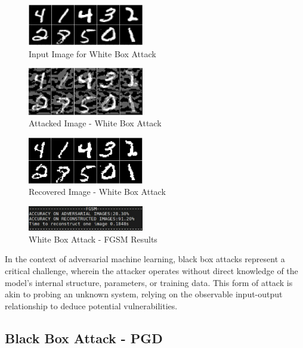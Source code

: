 \documentclass[letterpaper,twocolumn,10pt]{article}
\begin{document}
\begin{figure}[htbp]
  \centering
  \includegraphics[width=0.45\textwidth]{d.png}
  \caption{Input Image for White Box Attack}
  \label{fig:d}
\end{figure}

\begin{figure}[htbp]
  \centering
  \includegraphics[width=0.45\textwidth]{e.png}
  \caption{Attacked Image - White Box Attack}
  \label{fig:e}
\end{figure}

\begin{figure}[htbp]
  \centering
  \includegraphics[width=0.45\textwidth]{f.png}
  \caption{Recovered Image - White Box Attack}
  \label{fig:f}
\end{figure}

\begin{figure}[htbp]
  \centering
  \includegraphics[width=0.45\textwidth]{wfgsm.png}
  \caption{White Box Attack - FGSM Results}
  \label{fig:wfgsm}
\end{figure}

In the context of adversarial machine learning, black box attacks represent a critical challenge, wherein the attacker operates without direct knowledge of the model's internal structure, parameters, or training data. This form of attack is akin to probing an unknown system, relying on the observable input-output relationship to deduce potential vulnerabilities.


\subsection{Black Box Attack - PGD}
\end{document}
